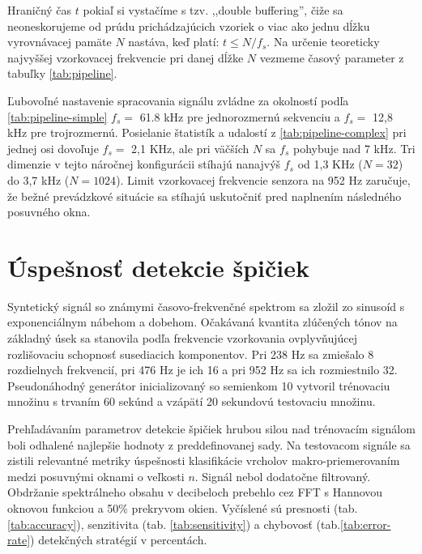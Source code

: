 Hraničný čas $t$ pokiaľ si vystačíme s tzv. ,,double buffering'', čiže sa neoneskorujeme od prúdu prichádzajúcich vzoriek o viac ako jednu
dĺžku vyrovnávacej pamäte $N$ nastáva, keď platí: $t \leq N / f_s$. Na určenie teoreticky najvyššej vzorkovacej frekvencie
pri danej dĺžke $N$ vezmeme časový parameter z tabuľky \ref{tab:pipeline}.

Ľubovoľné nastavenie spracovania signálu zvládne za okolností podľa \ref{tab:pipeline-simple} $f_s =$ 61.8 kHz pre jednorozmernú
sekvenciu a $f_s =$ 12,8 kHz pre trojrozmernú. Posielanie štatistík a udalostí z \ref{tab:pipeline-complex} pri jednej osi
dovoľuje $f_s =$ 2,1 KHz, ale pri väčších $N$ sa $f_s$ pohybuje nad 7 kHz. Tri dimenzie v tejto náročnej konfigurácii stíhajú nanajvýš $f_s$
od 1,3 KHz ($N = 32$) do 3,7 kHz ($N = 1024$). Limit vzorkovacej frekvencie senzora na 952 Hz zaručuje, že bežné prevádzkové
situácie sa stíhajú uskutočniť pred naplnením následného posuvného okna.

\section{Úspešnosť detekcie špičiek}
Syntetický signál so známymi časovo-frekvenčné spektrom sa zložil zo sinusoíd s exponenciálnym nábehom a dobehom.
Očakávaná kvantita zlúčených tónov na základný úsek sa stanovila podľa frekvencie vzorkovania ovplyvňujúcej rozlišovaciu
schopnosť susediacich komponentov. Pri 238 Hz sa zmiešalo 8 rozdielnych frekvencií, pri 476 Hz je ich 16 a pri 952 Hz sa
ich rozmiestnilo 32. Pseudonáhodný generátor inicializovaný so semienkom 10 vytvoril trénovaciu množinu s trvaním 60 sekúnd
a vzápätí 20 sekundovú testovaciu množinu.

Prehľadávaním parametrov detekcie špičiek hrubou silou nad trénovacím signálom boli odhalené najlepšie hodnoty z preddefinovanej sady.
Na testovacom signále sa zistili relevantné metriky úspešnosti klasifikácie vrcholov makro-priemerovaním medzi posuvnými oknami
o veľkosti $n$. Signál nebol dodatočne filtrovaný. Obdržanie spektrálneho obsahu v decibeloch prebehlo cez FFT s Hannovou
oknovou funkciou a 50\%  prekryvom okien. Vyčíslené sú presnosti (tab. \ref{tab:accuracy}), senzitivita (tab. \ref{tab:sensitivity}) a chybovosť (tab.\ref{tab:error-rate}) detekčných stratégií v percentách.


